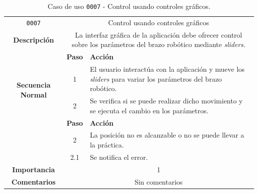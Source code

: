 \begin{table}[H]
    \centering
    \begin{tabularx}{\textwidth}{|c|c|X|}
        \cline{1-3}
        \texttt{0007}        & \multicolumn{2}{c|}{Control usando controles gráficos}                                      
        \\ \cline{1-3}
        \textbf{Descripción} & \multicolumn{2}{m{13cm}|}{La interfaz gráfica de la aplicación debe ofrecer control sobre los parámetros del brazo robótico mediante \textit{sliders}.}
        \\ \cline{1-3}
        \multirow{4}{*}{\textbf{Secuencia Normal}} & \textbf{Paso} & \textbf{Acción}
        \\ \cline{2-3}                    &   1  & El usuario interactúa con la aplicación y mueve los \textit{sliders} para variar los parámetros del brazo robótico.
        \\ \cline{2-3}                    &   2  & Se verifica si se puede realizar dicho movimiento y se ejecuta el cambio en los parámetros.
        \\ \cline{1-3}
        \multirow{2}{*}{\textbf{Excepciones}} & \textbf{Paso} & \textbf{Acción}
        \\ \cline{2-3}                    &   2   &  La posición no es alcanzable o no se puede llevar a la práctica.
        \\ \cline{2-3}                    &  2.1  &  Se notifica el error.
        \\ \cline{1-3}
        \textbf{Importancia}                 & \multicolumn{2}{c|}{1}           
        \\ \cline{1-3}
        \textbf{Comentarios}                 & \multicolumn{2}{c|}{Sin comentarios}
        \\ \cline{1-3}
    \end{tabularx}
    \caption{Caso de uso \texttt{0007} - Control usando controles gráficos.}
    \label{tab:CU0007}
    \label{tab:caso_de_uso_control_usando_controles_graficos}
\end{table}

